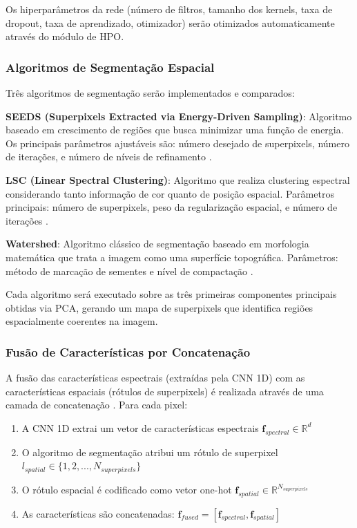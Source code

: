 Os hiperparâmetros da rede (número de filtros, tamanho dos kernels, taxa de dropout, taxa de aprendizado, otimizador) serão otimizados automaticamente através do módulo de HPO.

\subsubsection{Algoritmos de Segmentação Espacial}

Três algoritmos de segmentação serão implementados e comparados:

\textbf{SEEDS (Superpixels Extracted via Energy-Driven Sampling)}: Algoritmo baseado em crescimento de regiões que busca minimizar uma função de energia. Os principais parâmetros ajustáveis são: número desejado de superpixels, número de iterações, e número de níveis de refinamento \cite{bergh2013seedssuperpixelsextractedenergydriven}.

\textbf{LSC (Linear Spectral Clustering)}: Algoritmo que realiza clustering espectral considerando tanto informação de cor quanto de posição espacial. Parâmetros principais: número de superpixels, peso da regularização espacial, e número de iterações \cite{Zhengqin7298741}.

\textbf{Watershed}: Algoritmo clássico de segmentação baseado em morfologia matemática que trata a imagem como uma superfície topográfica. Parâmetros: método de marcação de sementes e nível de compactação \cite{Najman546254}.

Cada algoritmo será executado sobre as três primeiras componentes principais obtidas via PCA, gerando um mapa de superpixels que identifica regiões espacialmente coerentes na imagem.

\subsubsection{Fusão de Características por Concatenação}

A fusão das características espectrais (extraídas pela CNN 1D) com as características espaciais (rótulos de superpixels) é realizada através de uma camada de concatenação \cite{Souza2023}. Para cada pixel:

\begin{enumerate}
    \item A CNN 1D extrai um vetor de características espectrais $\mathbf{f}_{spectral} \in \mathbb{R}^{d}$
    \item O algoritmo de segmentação atribui um rótulo de superpixel $l_{spatial} \in \{1, 2, ..., N_{superpixels}\}$
    \item O rótulo espacial é codificado como vetor one-hot $\mathbf{f}_{spatial} \in \mathbb{R}^{N_{superpixels}}$
    \item As características são concatenadas: $\mathbf{f}_{fused} = [\mathbf{f}_{spectral}, \mathbf{f}_{spatial}]$
\end{enumerate}

